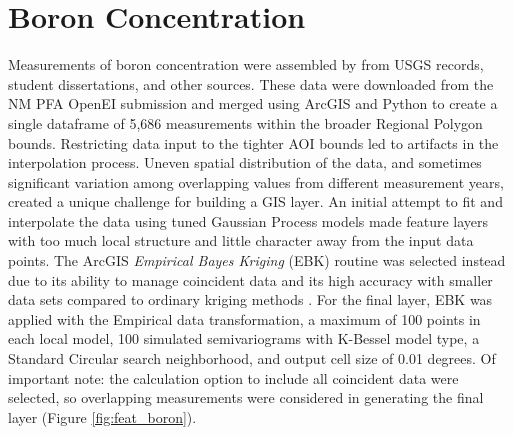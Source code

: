 \section{Boron Concentration}\label{app:dl_boron}
Measurements of boron concentration were assembled by \citet{bielicki_hydrogeolgic_2015} from USGS records, student dissertations, and other sources. These data were downloaded from the NM PFA OpenEI submission \citep{kelley_geothermal_2015} and merged using ArcGIS and Python to create a single dataframe of 5,686 measurements within the broader Regional Polygon bounds. Restricting data input to the tighter AOI bounds led to artifacts in the interpolation process. Uneven spatial distribution of the data, and sometimes significant variation among overlapping values from different measurement years, created a unique challenge for building a GIS layer. An initial attempt to fit and interpolate the data using tuned Gaussian Process models made feature layers with too much local structure and little character away from the input data points. The ArcGIS \textit{Empirical Bayes Kriging} (EBK) routine was selected instead due to its ability to manage coincident data and its high accuracy with smaller data sets compared to ordinary kriging methods \citep{esri_empirical_2021}. For the final layer, EBK was applied with the Empirical data transformation, a maximum of 100 points in each local model, 100 simulated semivariograms with K-Bessel model type, a Standard Circular search neighborhood, and output cell size of 0.01 degrees. Of important note: the calculation option to include all coincident data were selected, so overlapping measurements were considered in generating the final layer (Figure \ref{fig:feat_boron}).

